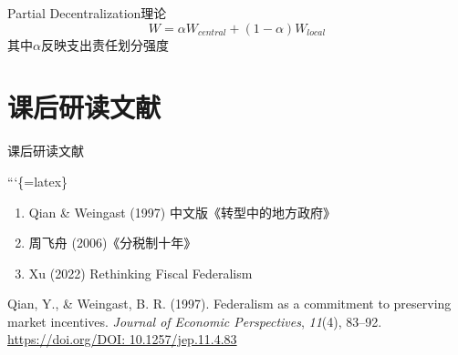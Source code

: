 \documentclass{beamer}
\begin{document}
\begin{frame}{Partial Decentralization理论}
\label{partial-decentralizationux7406ux8bba}
\[ 
W = \alpha W_{central} + (1-\alpha)W_{local}
\] 其中\(\alpha\)反映支出责任划分强度
\end{frame}

\section{课后研读文献}\label{ux8bfeux540eux7814ux8bfbux6587ux732e}

\begin{frame}{课后研读文献}
\footnotesize

```\{=latex\}

\begin{enumerate}
\item Qian \& Weingast (1997) 中文版《转型中的地方政府》
\item 周飞舟 (2006)《分税制十年》
\item Xu (2022) Rethinking Fiscal Federalism
\end{enumerate}

\label{refs}
\begin{CSLReferences}{1}{0}
Qian, Y., \& Weingast, B. R. (1997). Federalism as a commitment to
preserving market incentives. \emph{Journal of Economic Perspectives},
\emph{11}(4), 83--92.
\href{https://doi.org/DOI:\%2010.1257/jep.11.4.83}{https://doi.org/DOI:
10.1257/jep.11.4.83}

\end{CSLReferences}
\end{frame}
\end{document}
